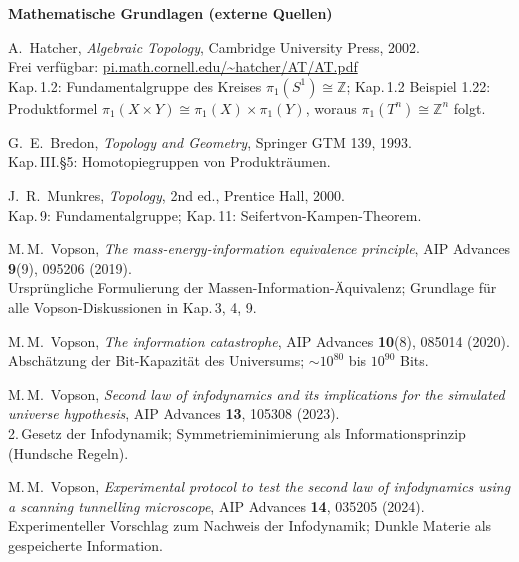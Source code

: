 \bigskip
\noindent\textbf{Mathematische Grundlagen (externe Quellen)}

\begin{description}[leftmargin=3.5em,style=sameline,itemsep=0.4em]

\item[{[T1]}] A.~Hatcher, \textit{Algebraic Topology},
  Cambridge University Press, 2002.\\
  Frei verfügbar: \href{https://pi.math.cornell.edu/~hatcher/AT/AT.pdf}{pi.math.cornell.edu/\textasciitilde hatcher/AT/AT.pdf}\\
  Kap.\,1.2: Fundamentalgruppe des Kreises $\pi_1(S^1) \cong \mathbb{Z}$;
  Kap.\,1.2 Beispiel 1.22: Produktformel $\pi_1(X \times Y) \cong \pi_1(X) \times \pi_1(Y)$,
  woraus $\pi_1(T^n) \cong \mathbb{Z}^n$ folgt.

\item[{[T2]}] G.~E.~Bredon, \textit{Topology and Geometry},
  Springer GTM 139, 1993.\\
  Kap.\,III.§5: Homotopiegruppen von Produkträumen.

\item[{[T3]}] J.~R.~Munkres, \textit{Topology}, 2nd ed.,
  Prentice Hall, 2000.\\
  Kap.\,9: Fundamentalgruppe; Kap.\,11: Seifertvon-Kampen-Theorem.

\end{description}

\begin{description}[leftmargin=3.5em,style=sameline,itemsep=0.4em]

\item[{[V1]}] M.\,M.~Vopson,
  \textit{The mass-energy-information equivalence principle},
  AIP Advances \textbf{9}(9), 095206 (2019).\\
  Ursprüngliche Formulierung der Massen-Information-Äquivalenz;
  Grundlage für alle Vopson-Diskussionen in Kap.\,3, 4, 9.

\item[{[V2]}] M.\,M.~Vopson,
  \textit{The information catastrophe},
  AIP Advances \textbf{10}(8), 085014 (2020).\\
  Abschätzung der Bit-Kapazität des Universums;
  $\sim 10^{80}$ bis $10^{90}$ Bits.

\item[{[V3]}] M.\,M.~Vopson,
  \textit{Second law of infodynamics and its implications
  for the simulated universe hypothesis},
  AIP Advances \textbf{13}, 105308 (2023).\\
  2.\,Gesetz der Infodynamik; Symmetrieminimierung als
  Informationsprinzip (Hundsche Regeln).

\item[{[V4]}] M.\,M.~Vopson,
  \textit{Experimental protocol to test the second law of
  infodynamics using a scanning tunnelling microscope},
  AIP Advances \textbf{14}, 035205 (2024).\\
  Experimenteller Vorschlag zum Nachweis der Infodynamik;
  Dunkle Materie als gespeicherte Information.

\end{description}


